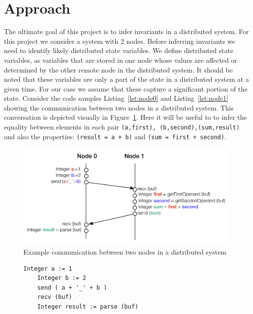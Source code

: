 \section{Approach}

The ultimate goal of this project is to infer invariants in a
distributed system. For this project we consider a
system with 2 nodes. Before inferring invariants we need to identify
likely distributed state variables. We define distributed state
variables, as variables that are stored in one node whose values are
affected or determined by the other remote node in the distributed
system. It should be noted that these variables are only a part of the
state in a distributed system at a given time. For our case we assume
that these capture a significant portion of the state. Consider the
code samples Listing~\ref{lst:node0} and Listing~\ref{lst:node1}
showing the communication between two nodes in a distributed system.
This conversation is depicted visually in
Figure~\ref{fig:sample_code_diag}. Here it will be useful to to infer
the equality between elements in each pair \texttt{(a,first),
(b,second),(sum,result)} and also the properties: \texttt{(result = a
+ b)} and \texttt{(sum = first + second)}.


\begin{figure}
  \includegraphics[width=\columnwidth]{sample_code.pdf}
  \caption{Example communication between two nodes in a distributed system}
  \label{fig:sample_code_diag}
\end{figure}

\begin{figure}
\begin{lstlisting}[caption={Sample code for Communication between 2 nodes - Node 0}, label=lst:node0]
    Integer a := 1
    Integer b := 2
    send ( a + '_' + b )
    recv (buf)
    Integer result := parse (buf)
\end{lstlisting}
\end{figure}

